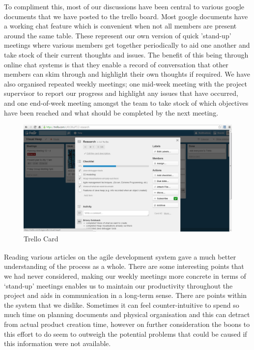 \documentclass[10pt, a4paper]{article}
\begin{document}
To compliment this, most of our discussions have been central to various google documents that we have posted to the trello board. Most google documents have a working chat feature which is convenient when not all members are present around the same table. These represent our own version of quick 'stand-up' meetings where various members get together periodically to aid one another and take stock of their current thoughts and issues. The benefit of this being through online chat systems is that they enable a record of conversation that other members can skim through and highlight their own thoughts if required. We have also organised repeated weekly meetings; one mid-week meeting with the project supervisor to report our progress and highlight any issues that have occurred, and one end-of-week meeting amongst the team to take stock of which objectives have been reached and what should be completed by the next meeting. 

\begin{figure}[h]
        \centering
        \includegraphics[width=\textwidth]{images/trello1.jpg}
        \caption{Trello Card}
\end{figure}

Reading various articles\textsuperscript{\cite{ssagile,atlasagile}} on the agile development system gave a much better understanding of the process as a whole. There are some interesting points that we had never considered, making our weekly meetings more concrete in terms of ‘stand-up’ meetings enables us to maintain our productivity throughout the project and aids in communication in a long-term sense. There are points within the system that we dislike. Sometimes it can feel counter-intuitive to spend so much time on planning documents and physical organisation and this can detract from actual product creation time, however on further consideration the boons to this effort to do seem to outweigh the potential problems that could be caused if this information were not available.
\end{document}
